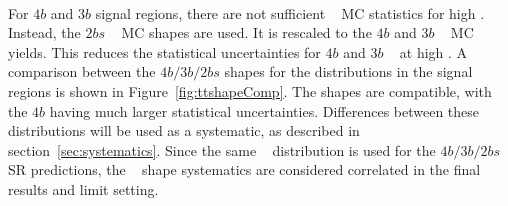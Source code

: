 \paragraph{}
For $4b$ and $3b$ signal regions, there are not sufficient \ttbar~ MC statistics for high \mtwoJ.
Instead, the $2bs$ \ttbar~ MC shapes are used.
It is rescaled to the $4b$ and $3b$ \ttbar~ MC yields.
This reduces the statistical uncertainties for $4b$ and $3b$ \ttbar~ at high \mtwoJ.
A comparison between the $4b/3b/2bs$ shapes for the \mtwoJ distributions in the signal regions is shown in Figure~\ref{fig:ttshapeComp}.
The shapes are compatible, with the $4b$ having much larger statistical uncertainties.  
Differences between these distributions will be used as a systematic, as described in section~\ref{sec:systematics}.
Since the same \ttbar~ distribution is used for the $4b/3b/2bs$ SR predictions, the \ttbar~ shape systematics are considered correlated in the final results and limit setting. 


